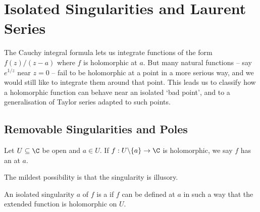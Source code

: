 \section{Isolated Singularities and Laurent Series}

The Cauchy integral formula lets us integrate functions of the form $f(z)/(z - a)$ where $f$ is holomorphic at $a$. But many natural functions -- say $e^{1/z}$ near $z = 0$ -- fail to be holomorphic at a point in a more serious way, and we would still like to integrate them around that point. This leads us to classify how a holomorphic function can behave near an isolated `bad point', and to a generalisation of Taylor series adapted to such points.

\subsection{Removable Singularities and Poles}

\begin{definition}
    Let $U \subseteq \C$ be open and $a \in U$. If $f: U \backslash \{a\} \rightarrow \C$ is holomorphic, we say $f$ has an  at $a$.
\end{definition}

The mildest possibility is that the singularity is illusory.

\begin{definition}
    An isolated singularity $a$ of $f$ is a  if $f$ can be defined at $a$ in such a way that the extended function is holomorphic on $U$.
\end{definition}

